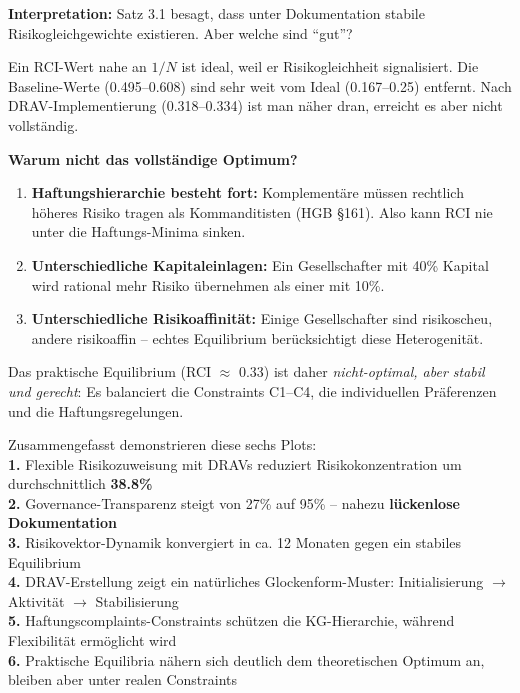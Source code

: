 \documentclass[a4paper,12pt]{article}
\theoremstyle{definition}
\begin{document}
\medskip
\noindent\textbf{Interpretation:} Satz 3.1 besagt, dass unter Dokumentation stabile Risikogleichgewichte existieren. Aber welche sind ``gut''?
 
Ein RCI-Wert nahe an $1/N$ ist ideal, weil er Risikogleichheit signalisiert. Die Baseline-Werte (0.495--0.608) sind sehr weit vom Ideal (0.167--0.25) entfernt. Nach DRAV-Implementierung (0.318--0.334) ist man näher dran, erreicht es aber nicht vollständig.
 
\textbf{Warum nicht das vollständige Optimum?}
\begin{enumerate}
    \item \textbf{Haftungshierarchie besteht fort:} Komplementäre müssen rechtlich höheres Risiko tragen als Kommanditisten (HGB \S 161). Also kann RCI nie unter die Haftungs-Minima sinken.
    \item \textbf{Unterschiedliche Kapitaleinlagen:} Ein Gesellschafter mit 40\% Kapital wird rational mehr Risiko übernehmen als einer mit 10\%.
    \item \textbf{Unterschiedliche Risikoaffinität:} Einige Gesellschafter sind risikoscheu, andere risikoaffin -- echtes Equilibrium berücksichtigt diese Heterogenität.
\end{enumerate}
 
Das praktische Equilibrium (RCI $\approx$ 0.33) ist daher \emph{nicht-optimal, aber stabil und gerecht}: Es balanciert die Constraints C1--C4, die individuellen Präferenzen und die Haftungsregelungen.
 
 
Zusammengefasst demonstrieren diese sechs Plots:\\
\textbf{1.} Flexible Risikozuweisung mit DRAVs reduziert Risikokonzentration um durchschnittlich \textbf{38.8\%} \\[0.3cm]
\textbf{2.} Governance-Transparenz steigt von 27\% auf 95\% -- nahezu \textbf{lückenlose Dokumentation} \\[0.3cm]
\textbf{3.} Risikovektor-Dynamik konvergiert in ca. 12 Monaten gegen ein stabiles Equilibrium \\[0.3cm]
\textbf{4.} DRAV-Erstellung zeigt ein natürliches Glockenform-Muster: Initialisierung $\to$ Aktivität $\to$ Stabilisierung \\[0.3cm]
\textbf{5.} Haftungscomplaints-Constraints schützen die KG-Hierarchie, während Flexibilität ermöglicht wird \\[0.3cm]
\textbf{6.} Praktische Equilibria nähern sich deutlich dem theoretischen Optimum an, bleiben aber unter realen Constraints
 
\end{document}
